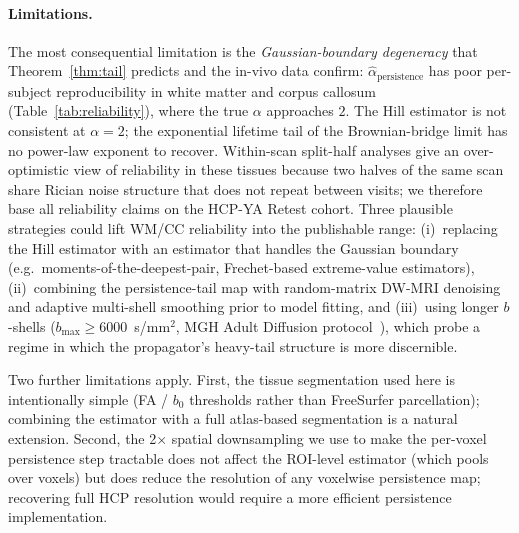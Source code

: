 \documentclass[11pt,letterpaper]{article}
\newcommand{\stab}{\alpha}
\begin{document}
\paragraph*{Limitations.}
The most consequential limitation is the
\emph{Gaussian-boundary degeneracy} that
Theorem~\ref{thm:tail} predicts and the in-vivo data confirm:
$\widehat{\stab}_{\mathrm{persistence}}$ has poor per-subject
reproducibility in white matter and corpus callosum
(Table~\ref{tab:reliability}), where the true $\stab$ approaches
$2$. The Hill estimator is not consistent at
$\stab=2$; the exponential lifetime tail of the Brownian-bridge
limit has no power-law exponent to recover. Within-scan split-half
analyses give an over-optimistic view of reliability in these tissues
because two halves of the same scan share Rician noise structure
that does not repeat between visits; we therefore base all
reliability claims on the HCP-YA Retest cohort. Three plausible
strategies could lift WM/CC reliability into the publishable range:
(i)~replacing the Hill estimator with an estimator that handles the
Gaussian boundary (e.g.\ moments-of-the-deepest-pair, Frechet-based
extreme-value estimators), (ii)~combining the persistence-tail map
with random-matrix DW-MRI denoising~\citep{veraart2016mppca} and
adaptive multi-shell smoothing prior to model fitting, and
(iii)~using longer $b$-shells ($b_{\max}\ge 6000$~s/mm$^2$, MGH Adult
Diffusion protocol~\citep{setsompop2013mgh}), which probe a regime
in which the propagator's heavy-tail structure is more discernible.

Two further limitations apply. First, the tissue segmentation used
here is intentionally simple (FA / $b_0$ thresholds rather than
FreeSurfer parcellation); combining the estimator with a
full atlas-based segmentation is a natural extension. Second, the
2$\times$ spatial downsampling we use to make the per-voxel
persistence step tractable does not affect the ROI-level estimator
(which pools over voxels) but does reduce the resolution of any
voxelwise persistence map; recovering full HCP resolution would
require a more efficient persistence implementation.
\end{document}
